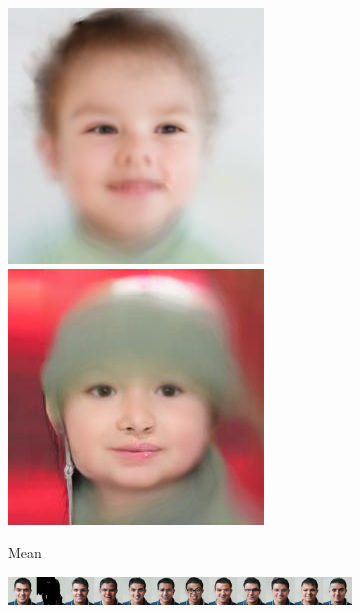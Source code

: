 \begin{figure}[t]
\begin{subfigure}[t]{0.1\textwidth}
    \includegraphics[height=\cmgfailureimgheight]{figs/cigcvae/co_mod_gan_failure/avg_co_mod_gan_1_4_2.jpg}
    \includegraphics[height=\cmgfailureimgheight]{figs/cigcvae/co_mod_gan_failure/avg_co_mod_gan_56_4_12.jpg}
    \caption{Mean}
  \end{subfigure}
  \caption{Examples of completions lacking semantic diversity in CoModGAN. Panel
    (a) shows the true image and the masked version on which the completions are
    conditioned. Panel (b) shows 10 completions sampled randomly from the
    CoModGAN model. Panel (c) shows the mean image computed from 100 sampled
    completions. On each row, the completions are mostly semantically similar to
    eachother yet different from the ground truth image, indicating that they
    are not faithfully representing the true posterior. This behaviour can be
    contrasted with that of IPA in \cref{fig:cigcvae-comodgan-failure-aipo}.}
  \label{fig:cigcvae-comodgan-failure}
  \vspace{.5cm}
  \begin{subfigure}[t]{0.14\textwidth}
    \centering
    \includegraphics[trim=0px 0px 2560px 0px, clip, height=\cmgfailureimgheight]{figs/cigcvae/co_mod_gan_failure/aipo_0_3_2.jpg}

\end{subfigure}
\end{figure}
